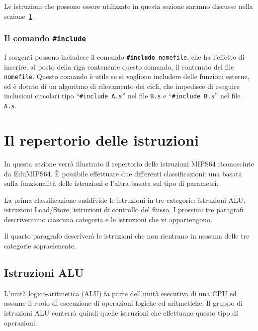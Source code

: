 \documentclass[12pt]{report}
\newcommand{\EM}{EduMIPS64}
\newcommand{\MS}{MIPS64}
\begin{document}
Le istruzioni che possono essere utilizzate in questa sezione saranno discusse nella sezione~\ref{instructions}

\subsection{Il comando \texttt{\#include}}
I sorgenti possono includere il comando \texttt{\textbf{\#include} nomefile}, che
ha l'effetto di inserire, al posto della riga contenente questo comando, il
contenuto del file \texttt{nomefile}.
Questo comando \`e utile se si vogliono includere delle funzioni esterne, ed \`e
dotato di un algoritmo di rilevamento dei cicli, che impedisce di eseguire
inclusioni circolari tipo ``\texttt{\#include A.s}'' nel file \texttt{B.s} e
``\texttt{\#include B.s}'' nel file \texttt{A.s}.

\chapter{Il repertorio delle istruzioni}
\label{instructions}

In questa sezione verr\`{a} illustrato il repertorio delle istruzioni \MS{} riconosciute da \EM{}.
\`{E} possibile effettuare due differenti classificazioni: una basata sulla funzionalit\`{a} delle istruzioni e 
l'altra basata sul tipo di parametri.


La prima classificazione suddivide le istruzioni in tre categorie: istruzioni ALU, istruzioni Load/Store, 
istruzioni di controllo del flusso. I prossimi tre paragrafi descriveranno ciascuna categoria e le istruzioni che vi appartengono.

Il quarto paragrafo descriver\`{a} le istruzioni che non rientrano in nessuna delle tre categorie sopraelencate.


\section{Istruzioni ALU}
L'unit\`{a} logico-aritmetica (ALU) fa parte dell'unit\`{a} esecutiva di una CPU ed assume il ruolo di esecuzione 
di operazioni logiche ed aritmetiche. Il gruppo di istruzioni ALU conterr\`{a} quindi quelle istruzioni 
che effettuano questo tipo di operazioni.
\end{document}
